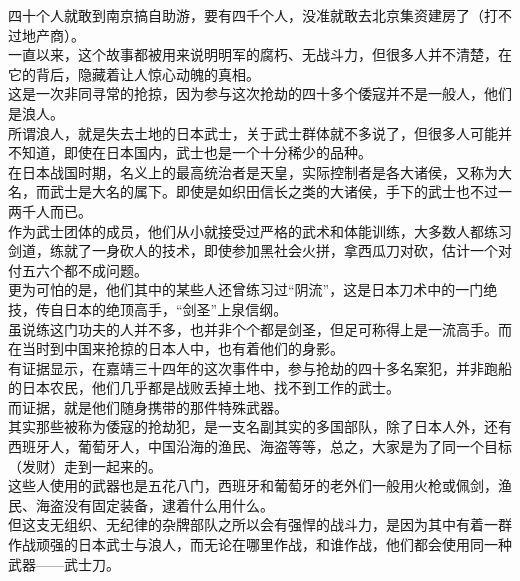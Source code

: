 \begin{multicols}{\theparacolNo}
四十个人就敢到南京搞自助游，要有四千个人，没准就敢去北京集资建房了（打不过地产商）。\\

一直以来，这个故事都被用来说明明军的腐朽、无战斗力，但很多人并不清楚，在它的背后，隐藏着让人惊心动魄的真相。\\

这是一次非同寻常的抢掠，因为参与这次抢劫的四十多个倭寇并不是一般人，他们是浪人。\\

所谓浪人，就是失去土地的日本武士，关于武士群体就不多说了，但很多人可能并不知道，即使在日本国内，武士也是一个十分稀少的品种。\\

在日本战国时期，名义上的最高统治者是天皇，实际控制者是各大诸侯，又称为大名，而武士是大名的属下。即使是如织田信长之类的大诸侯，手下的武士也不过一两千人而已。\\

作为武士团体的成员，他们从小就接受过严格的武术和体能训练，大多数人都练习剑道，练就了一身砍人的技术，即使参加黑社会火拼，拿西瓜刀对砍，估计一个对付五六个都不成问题。\\

更为可怕的是，他们其中的某些人还曾练习过“阴流”，这是日本刀术中的一门绝技，传自日本的绝顶高手，“剑圣”上泉信纲。\\

虽说练这门功夫的人并不多，也并非个个都是剑圣，但足可称得上是一流高手。而在当时到中国来抢掠的日本人中，也有着他们的身影。\\

有证据显示，在嘉靖三十四年的这次事件中，参与抢劫的四十多名案犯，并非跑船的日本农民，他们几乎都是战败丢掉土地、找不到工作的武士。\\

而证据，就是他们随身携带的那件特殊武器。\\

其实那些被称为倭寇的抢劫犯，是一支名副其实的多国部队，除了日本人外，还有西班牙人，葡萄牙人，中国沿海的渔民、海盗等等，总之，大家是为了同一个目标（发财）走到一起来的。\\

这些人使用的武器也是五花八门，西班牙和葡萄牙的老外们一般用火枪或佩剑，渔民、海盗没有固定装备，逮着什么用什么。\\

但这支无组织、无纪律的杂牌部队之所以会有强悍的战斗力，是因为其中有着一群作战顽强的日本武士与浪人，而无论在哪里作战，和谁作战，他们都会使用同一种武器——武士刀。\\


\end{multicols}
